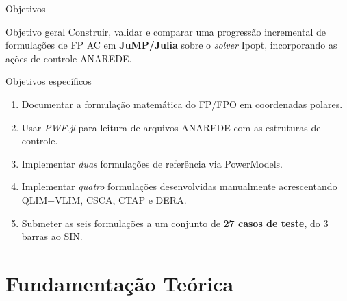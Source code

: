 \documentclass{libs/ufc_format}
\begin{document}
\begin{frame}{Objetivos}
    \begin{block}{Objetivo geral}
        Construir, validar e comparar uma progressão incremental de formulações de FP AC em \textbf{JuMP/Julia} sobre o \textit{solver} Ipopt, incorporando as ações de controle ANAREDE.
    \end{block}

    \begin{exampleblock}{Objetivos específicos}
        \begin{enumerate}
            \item Documentar a formulação matemática do FP/FPO em coordenadas polares.
            \item Usar \textit{PWF.jl} para leitura de arquivos ANAREDE com as estruturas de controle.
            \item Implementar \emph{duas} formulações de referência via PowerModels.
            \item Implementar \emph{quatro} formulações desenvolvidas manualmente acrescentando QLIM+VLIM, CSCA, CTAP e DERA.
            \item Submeter as seis formulações a um conjunto de \textbf{27 casos de teste}, do 3 barras ao SIN.
        \end{enumerate}
    \end{exampleblock}
\end{frame}

\section{Fundamentação Teórica}
\end{document}

